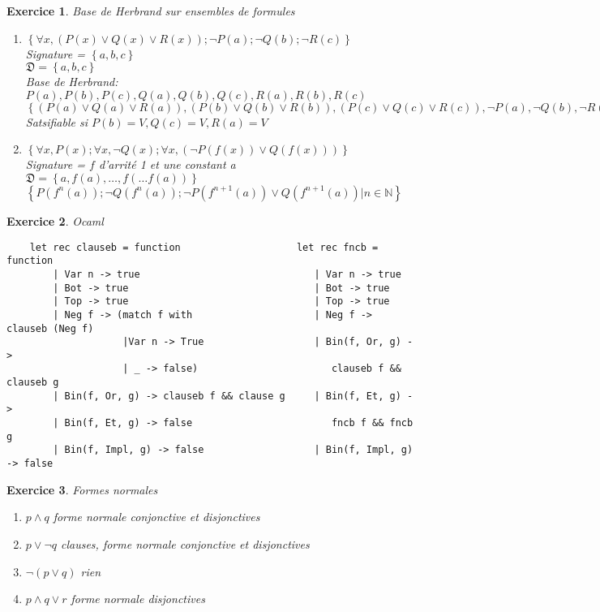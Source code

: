 \documentclass{article}
\theoremstyle{plain}
\newtheorem{exo}{Exercice}%
\begin{document}
\begin{exo} Base de Herbrand sur ensembles de formules
\begin{enumerate}
  \item $\left\{\forall x, (P(x) \vee Q(x) \vee R(x)); \neg P(a); \neg Q(b); \neg R(c)\right\}$\\
    Signature = $\left\{a, b, c\right\}$\\
    $\mathfrak{D} = \left\{a, b, c\right\}$\\
    Base de Herbrand: $P(a), P(b), P(c), Q(a), Q(b), Q(c), R(a), R(b), R(c)$\\
    $\left\{(P(a) \vee Q(a) \vee R(a)), (P(b) \vee Q(b) \vee R(b)), (P(c) \vee Q(c) \vee R(c)),
      \neg P(a), \neg Q(b), \neg R(c)\right\}$\\
    Satsifiable si $P(b) = V, Q(c) = V, R(a) = V$

  \item $\left\{\forall x, P(x); \forall x, \neg Q(x); \forall x, (\neg P(f(x)) \vee Q(f(x)))\right\}$\\
    Signature = $f$ d'arrité 1 et une constant a\\
    $\mathfrak{D} = \left\{a, f(a), \ldots, f(\ldots f(a))\right\}$\\
    $\left\{P(f^n(a)); \neg Q(f^n(a)); \neg P(f^{n+1}(a)) \vee Q(f^{n+1}(a)) | n \in \mathbb{N}\right\}$
    
\end{enumerate}
\end{exo}

\begin{exo} Ocaml
\begin{lstlisting}
    let rec clauseb = function                    let rec fncb = function
        | Var n -> true                              | Var n -> true
        | Bot -> true                                | Bot -> true
        | Top -> true                                | Top -> true
        | Neg f -> (match f with                     | Neg f -> clauseb (Neg f)
                    |Var n -> True                   | Bin(f, Or, g) ->     
                    | _ -> false)                       clauseb f && clauseb g
        | Bin(f, Or, g) -> clauseb f && clause g     | Bin(f, Et, g) ->
        | Bin(f, Et, g) -> false                        fncb f && fncb g
        | Bin(f, Impl, g) -> false                   | Bin(f, Impl, g) -> false
\end{lstlisting}
\end{exo}

\begin{exo} Formes normales
\begin{enumerate}
    \item $p \wedge q$ forme normale conjonctive et disjonctives
    \item $p \vee \neg q$ clauses, forme normale conjonctive et disjonctives
    \item $\neg(p \vee q)$ rien
    \item $p \wedge q \vee r$ forme normale disjonctives
\end{enumerate}
\end{exo}
\end{document}
